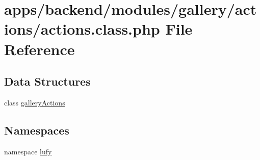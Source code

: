 \hypertarget{backend_2modules_2gallery_2actions_2actions_8class_8php}{\section{apps/backend/modules/gallery/actions/actions.class.\-php File Reference}
\label{backend_2modules_2gallery_2actions_2actions_8class_8php}
}
\subsection*{Data Structures}
\begin{DoxyCompactItemize}
\item 
class \hyperlink{classgallery_actions}{gallery\-Actions}
\end{DoxyCompactItemize}
\subsection*{Namespaces}
\begin{DoxyCompactItemize}
\item 
namespace \hyperlink{namespacelufy}{lufy}
\end{DoxyCompactItemize}
